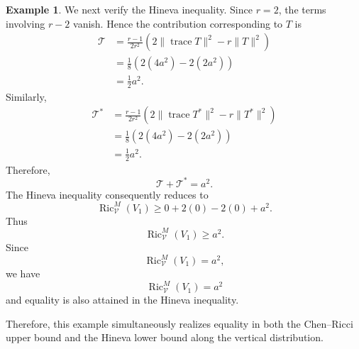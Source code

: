 \documentclass[10pt,a4paper]{article}
\theoremstyle{definition}
\newtheorem{example}[theorem]{Example}
\theoremstyle{remark}
\numberwithin{equation}{section}
\begin{document}
\begin{example}
We next verify the Hineva inequality. Since $r=2$, the terms
involving $r-2$ vanish. Hence the contribution corresponding to
$T$ is
\[
\begin{aligned}
\mathcal{T}
&=
\frac{r-1}{2r^{2}}
\left(
2\|\operatorname{trace}T\|^{2}
-r\|T\|^{2}
\right)\\
&=
\frac18
\left(
2(4a^{2})-2(2a^{2})
\right)\\
&=\frac12a^{2}.
\end{aligned}
\]
Similarly,
\[
\begin{aligned}
\mathcal{T}^{*}
&=
\frac{r-1}{2r^{2}}
\left(
2\|\operatorname{trace}T^{*}\|^{2}
-r\|T^{*}\|^{2}
\right)\\
&=
\frac18
\left(
2(4a^{2})-2(2a^{2})
\right)\\
&=\frac12a^{2}.
\end{aligned}
\]
Therefore,
\[
\mathcal{T}+\mathcal{T}^{*}=a^{2}.
\]
The Hineva inequality consequently reduces to
\[
\operatorname{Ric}^{M}_{\mathcal V}(V_{1})
\geq
0+2(0)-2(0)+a^{2}.
\]
Thus
\[
\operatorname{Ric}^{M}_{\mathcal V}(V_{1})
\geq a^{2}.
\]
Since
\[
\operatorname{Ric}^{M}_{\mathcal V}(V_{1})=a^{2},
\]
we have
\[
\boxed{
\operatorname{Ric}^{M}_{\mathcal V}(V_{1})
=a^{2}
}
\]
and equality is also attained in the Hineva inequality.

Therefore, this example simultaneously realizes equality in both the
Chen--Ricci upper bound and the Hineva lower bound along the vertical
distribution.
\end{example}
\end{document}
